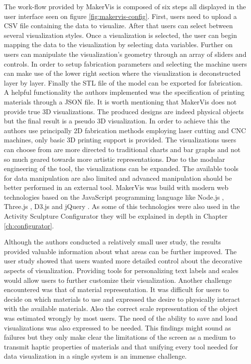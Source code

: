 \documentclass[../medieninformatik-arbeit.tex]{subfiles}
\begin{document}
The work-flow provided by MakerVis is composed of six steps all displayed in the user interface seen on figure \ref{fig:makervis-config}. First, users need to upload a CSV file containing the data to visualize. After that users can select between several visualization styles. Once a visualization is selected, the user can begin mapping the data to the visualization by selecting data variables. Further on users can manipulate the visualization's geometry through an array of sliders and controls. In order to setup fabrication parameters and selecting the machine users can make use of the lower right section where the visualization is deconstructed layer by layer. Finally the STL file of the model can be exported for fabrication. A helpful functionality the authors implemented was the specification of printing materials through a JSON file.  It is worth mentioning that MakerVis does not provide true 3D visualizations. The produced designs are indeed physical objects but the final result is a pseudo 3D visualization. In order to achieve this the authors use principally 2D fabrication methods employing laser cutting and CNC machines, only basic 3D printing support is provided. The visualizations users can choose from are more directed to traditional charts and bar graphs and not so much geared towards more artistic representations. Due to the modular engineering of the tool, the visualizations can be expanded. The available tools for data manipulation are also limited and advanced manipulation should be better performed in an external tool. MakerVis was build with modern web technologies based on the JavaScript programming language like Node.js \cite{joyent2015node}, Three.js \cite{cabello2010three}, D3.js \cite{bostock2015d3js} and jQuery \cite{jqf2015jquery}. As some of this technologies were also used in the Activity Sculpture Configurator they will be explained in depth in Chapter \ref{ch:configurator}. 

Although the authors conducted a relatively small user study, the results provided valuable information about what areas can be further improved. The user study showed that users wanted more detailed control about the decorative aspects of visualization. Providing tools for personalizing text labels and scales would allow users to further customize their visualization. Another challenge encountered was that of material representation. It was difficult for users to decide on which materials to use and expressed the desire to physically interact with the available materials. Also the correct scale representation of the object was estimated wrongly by most users. The need of the ability to save and load visualizations was also expressed to be needed. This findings might sound as failures but they only make clear the limitations of the screen as a medium to transmit haptic properties of materials and that unifying every tool needed for data visualization in a single system is an immense challenge.
\end{document}
